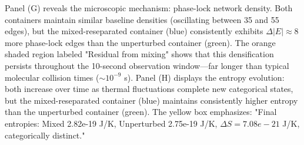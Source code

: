 Panel (G) reveals the microscopic mechanism: phase-lock network density. Both containers maintain similar baseline densities (oscillating between 35 and 55 edges), but the mixed-reseparated container (blue) consistently exhibits $\Delta |E| \approx 8$ more phase-lock edges than the unperturbed container (green). The orange shaded region labeled "Residual from mixing" shows that this densification persists throughout the 10-second observation window—far longer than typical molecular collision times ($\sim 10^{-9}$ s). Panel (H) displays the entropy evolution: both increase over time as thermal fluctuations complete new categorical states, but the mixed-reseparated container (blue) maintains consistently higher entropy than the unperturbed container (green). The yellow box emphasizes: "Final entropies: Mixed 2.82e-19 J/K, Unperturbed 2.75e-19 J/K, $\Delta S = 7.08e-21$ J/K, categorically distinct."

